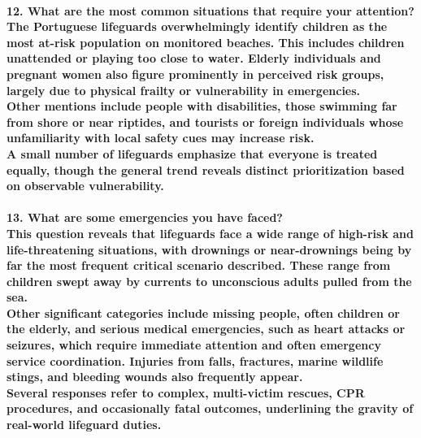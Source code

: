 \paragraph{
\textbf{12. What are the most common situations that require your attention?}
\\
The Portuguese lifeguards overwhelmingly identify children as the most at-risk population on monitored beaches. This includes children unattended or playing too close to water. Elderly individuals and pregnant women also figure prominently in perceived risk groups, largely due to physical frailty or vulnerability in emergencies.
\\
Other mentions include people with disabilities, those swimming far from shore or near riptides, and tourists or foreign individuals whose unfamiliarity with local safety cues may increase risk.
\\
A small number of lifeguards emphasize that everyone is treated equally, though the general trend reveals distinct prioritization based on observable vulnerability.}

\paragraph{
\textbf{13. What are some emergencies you have faced?}
\\
This question reveals that lifeguards face a wide range of high-risk and life-threatening situations, with drownings or near-drownings being by far the most frequent critical scenario described. These range from children swept away by currents to unconscious adults pulled from the sea.
\\
Other significant categories include missing people, often children or the elderly, and serious medical emergencies, such as heart attacks or seizures, which require immediate attention and often emergency service coordination. Injuries from falls, fractures, marine wildlife stings, and bleeding wounds also frequently appear.
\\
Several responses refer to complex, multi-victim rescues, CPR procedures, and occasionally fatal outcomes, underlining the gravity of real-world lifeguard duties.}

